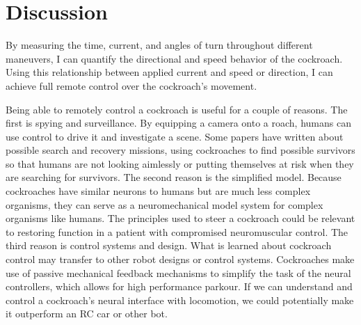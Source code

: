 \section{Discussion}


By measuring the time, current, and angles of turn throughout different maneuvers, I can quantify the directional and speed behavior of the cockroach. Using this relationship between applied current and speed or direction, I can achieve full remote control over the cockroach's movement. 

Being able to remotely control a cockroach is useful for a couple of reasons. The first is spying and surveillance. By equipping a camera onto a roach, humans can use control to drive it and investigate a scene. Some papers have written about possible search and recovery missions, using cockroaches to find possible survivors so that humans are not looking aimlessly or putting themselves at risk when they are searching for survivors. The second reason is the simplified model. Because cockroaches have similar neurons to humans but are much less complex organisms, they can serve as a neuromechanical model system for complex organisms like humans. The principles used to steer a cockroach could be relevant to restoring function in a patient with compromised neuromuscular control. The third reason is control systems and design. What is learned about cockroach control may transfer to other robot designs or control systems. Cockroaches make use of passive mechanical feedback mechanisms to simplify the task of the neural controllers, which allows for high performance parkour. If we can understand and control a cockroach's neural interface with locomotion, we could potentially make it outperform an RC car or other bot.